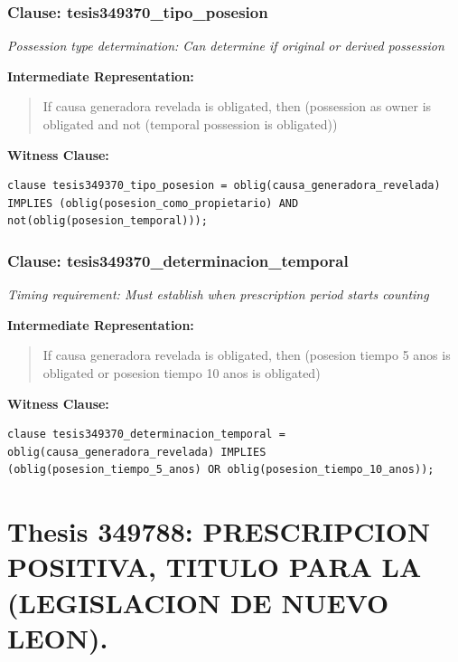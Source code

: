 \documentclass[11pt,a4paper]{article}
\begin{document}
\subsubsection{Clause: tesis349370\_tipo\_posesion}

\textit{Possession type determination: Can determine if original or derived possession}

\textbf{Intermediate Representation:}

\begin{quote}
If causa generadora revelada is obligated, then (possession as owner is obligated and not (temporal possession is obligated))
\end{quote}

\textbf{Witness Clause:}

\begin{lstlisting}[style=witnessstyle, language=Witness]
clause tesis349370_tipo_posesion = oblig(causa_generadora_revelada) IMPLIES (oblig(posesion_como_propietario) AND not(oblig(posesion_temporal)));
\end{lstlisting}

\subsubsection{Clause: tesis349370\_determinacion\_temporal}

\textit{Timing requirement: Must establish when prescription period starts counting}

\textbf{Intermediate Representation:}

\begin{quote}
If causa generadora revelada is obligated, then (posesion tiempo 5 anos is obligated or posesion tiempo 10 anos is obligated)
\end{quote}

\textbf{Witness Clause:}

\begin{lstlisting}[style=witnessstyle, language=Witness]
clause tesis349370_determinacion_temporal = oblig(causa_generadora_revelada) IMPLIES (oblig(posesion_tiempo_5_anos) OR oblig(posesion_tiempo_10_anos));
\end{lstlisting}

\newpage

\section{Thesis 349788: PRESCRIPCION POSITIVA, TITULO PARA LA (LEGISLACION DE NUEVO LEON).}
\label{thesis:349788}
\end{document}
